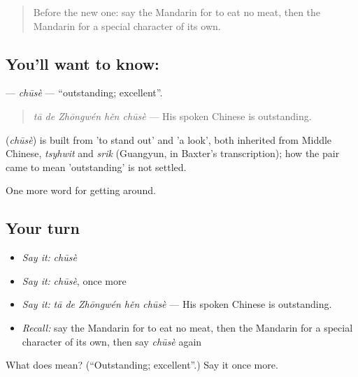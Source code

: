 \label{lesson:ZH-C451-chuse}



\begin{quote}
Before the new one: say the Mandarin for to eat no meat, then the Mandarin for a special character of its own.
\end{quote}

\subsection*{You'll want to know: }
\textbf{} — \emph{chūsè} — \textquotedblleft{}outstanding; excellent\textquotedblright{}.

\begin{quote}
\textbf{} \emph{tā de Zhōngwén hěn chūsè} — His spoken Chinese is outstanding.
\end{quote}

\begin{cousinweb}
\textbf{} (\emph{chūsè}) is built from  'to stand out' and  'a look', both inherited from Middle Chinese, \emph{tsyhwit} and \emph{srik} (Guangyun, in Baxter's transcription); how the pair came to mean 'outstanding' is not settled.
\end{cousinweb}

\begin{grammarlens}[title={What you've built}]
One more word for getting around.
\end{grammarlens}

\subsection*{Your turn}
\begin{itemize}
\raggedright
  \item \emph{Say it:} \emph{chūsè}
  \item \emph{Say it:} \emph{chūsè}, once more
  \item \emph{Say it:} \emph{tā de Zhōngwén hěn chūsè} — His spoken Chinese is outstanding.
  \item \emph{Recall:} say the Mandarin for to eat no meat, then the Mandarin for a special character of its own, then say \emph{chūsè} again
\end{itemize}

\begin{tcolorbox}[breakable,colback=teal!4,colframe=teal!35!black,title={Before you move on}]
What does  mean? (\textquotedblleft{}Outstanding; excellent\textquotedblright{}.) Say it once more.
\end{tcolorbox}
